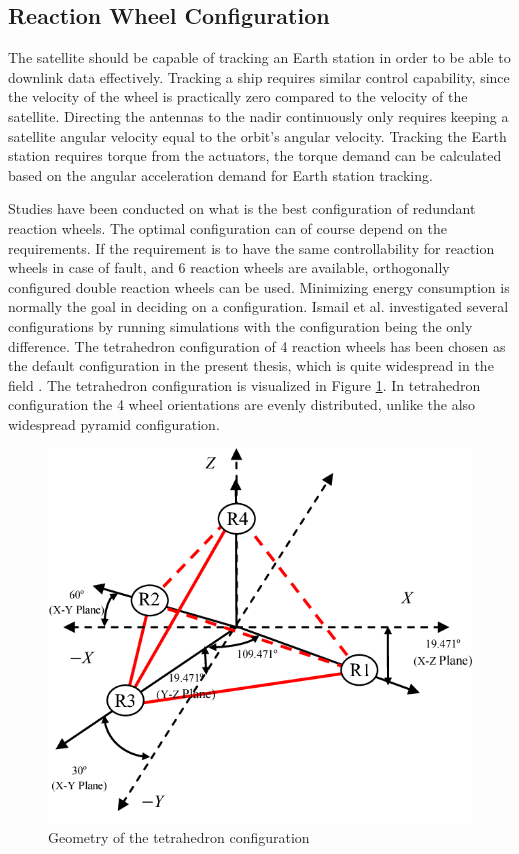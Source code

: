 \subsection{Reaction Wheel Configuration}
\label{ref:reactConfig}

The satellite should be capable of tracking an Earth station in order to be able to downlink data effectively. Tracking a ship requires similar control capability, since the velocity of the wheel is practically zero compared to the velocity of the satellite. Directing the antennas to the nadir continuously only requires keeping a satellite angular velocity equal to the orbit's angular velocity.
Tracking the Earth station requires torque from the actuators, the torque demand can be calculated based on the angular acceleration demand for Earth station tracking.


Studies have been conducted on what is the best configuration of redundant reaction wheels. The optimal configuration can of course depend on the requirements. If the requirement is to have the same controllability for reaction wheels in case of fault, and 6 reaction wheels are available, orthogonally configured double reaction wheels can be used. Minimizing energy consumption is normally the goal in deciding on a configuration. Ismail et al. \cite{ReactionWheelConfigSim} investigated several configurations by running simulations with the configuration being the only difference. The tetrahedron configuration of 4 reaction wheels has been chosen as the default configuration in the present thesis, which is quite widespread in the field \cite{reactConfigNasa}. The tetrahedron configuration is visualized in Figure \ref{fig:tetrahedron}.
In tetrahedron configuration the 4 wheel orientations are evenly distributed, unlike the also widespread pyramid configuration. 

\begin{figure}[H]
	\centering 
	\includegraphics[width=120mm]{figures/tetrahedron}	
	\caption{Geometry of the tetrahedron configuration \cite{Kumar2015DesignAD}}
	\label{fig:tetrahedron}
\end{figure}

